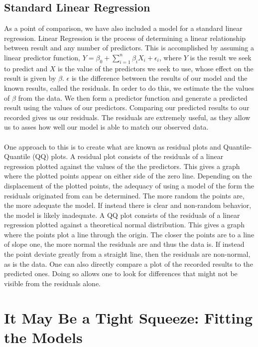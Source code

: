 \documentclass{article}
\begin{document}
\subsection{Standard Linear Regression}
As a point of comparison, we have also included a model for a standard linear regression. Linear Regression is the process of determining a linear relationship between result and any number of predictors. This is accomplished by assuming a linear predictor function, $Y=\beta_0+\sum_{i=1}^n\beta_iX_i+\epsilon_i$, where $Y$ is the result we seek to predict and $X$ is the value of the predictors we seek to use, whose effect on the result is given by $\beta$. $\epsilon$ is the difference between the results of our model and the known results, called the residuals. In order to do this, we estimate the the values of $\beta$ from the data. We then form a predictor function and generate a predicted result using the values of our predictors. Comparing our predicted results to our recorded gives us our residuals. The residuals are extremely useful, as they allow us to asses how well our model is able to match our observed data.\\\\
One approach to this is to create what are known as residual plots and Quantile-Quantile (QQ) plots. A residual plot consists of the residuals of a linear regression plotted against the values of the the predictors. This gives a graph where the plotted points appear on either side of the zero line. Depending on the displacement of the plotted points, the adequacy of using a model of the form the residuals originated from can be determined. The more random the points are, the more adequate the model. If instead there is clear and non-random behavior, the model is likely inadequate. A QQ plot consists of the residuals of a linear regression plotted against a theoretical normal distribution. This gives a graph where the points plot a line through the origin. The closer the points are to a line of slope one, the more normal the residuals are and thus the data is. If instead the point deviate greatly from a straight line, then the residuals are non-normal, as is the data. One can also directly compare a plot of the recorded results to the predicted ones. Doing so allows one to look for differences that might not be visible from the residuals alone.

\section{It May Be a Tight Squeeze: Fitting the Models}
\end{document}
